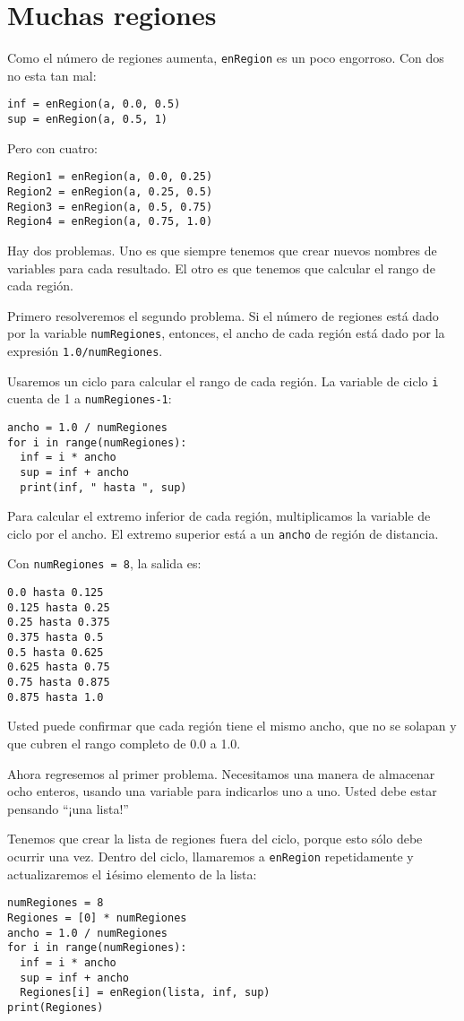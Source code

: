\section{Muchas regiones}

\label{muchasregiones}

Como el número de regiones aumenta, \texttt{enRegion} es un poco engorroso.
Con dos no esta tan mal:
\begin{verbatim}
inf = enRegion(a, 0.0, 0.5)
sup = enRegion(a, 0.5, 1)
\end{verbatim}
 Pero con cuatro:
\begin{verbatim}
Region1 = enRegion(a, 0.0, 0.25)
Region2 = enRegion(a, 0.25, 0.5)
Region3 = enRegion(a, 0.5, 0.75)
Region4 = enRegion(a, 0.75, 1.0)
\end{verbatim}

Hay dos problemas. Uno es que siempre tenemos que crear nuevos nombres
de variables para cada resultado. El otro es que tenemos que calcular
el rango de cada región.

Primero resolveremos el segundo problema. Si el número de regiones
está dado por la variable \texttt{numRegiones}, entonces, el ancho
de cada región está dado por la expresión \texttt{1.0/numRegiones}.

Usaremos un ciclo para calcular el rango de cada región. La variable
de ciclo \texttt{i} cuenta de 1 a \texttt{numRegiones-1}:
\begin{verbatim}
ancho = 1.0 / numRegiones
for i in range(numRegiones):
  inf = i * ancho
  sup = inf + ancho
  print(inf, " hasta ", sup)
\end{verbatim}

Para calcular el extremo inferior de cada región, multiplicamos la
variable de ciclo por el ancho. El extremo superior está a un \texttt{ancho}
de región de distancia.

Con \texttt{numRegiones = 8}, la salida es:
\begin{verbatim}
0.0 hasta 0.125
0.125 hasta 0.25
0.25 hasta 0.375
0.375 hasta 0.5
0.5 hasta 0.625
0.625 hasta 0.75
0.75 hasta 0.875
0.875 hasta 1.0
\end{verbatim}
Usted puede confirmar que cada región tiene el mismo ancho, que no
se solapan y que cubren el rango completo de 0.0 a 1.0.

Ahora regresemos al primer problema. Necesitamos una manera de almacenar
ocho enteros, usando una variable para indicarlos uno a uno. Usted
debe estar pensando ``¡una lista!''

Tenemos que crear la lista de regiones fuera del ciclo, porque esto
sólo debe ocurrir una vez. Dentro del ciclo, llamaremos a \texttt{enRegion}
repetidamente y actualizaremos el \texttt{i}ésimo elemento de la lista:
\begin{verbatim}
numRegiones = 8
Regiones = [0] * numRegiones
ancho = 1.0 / numRegiones
for i in range(numRegiones):
  inf = i * ancho
  sup = inf + ancho
  Regiones[i] = enRegion(lista, inf, sup)
print(Regiones)
\end{verbatim}

